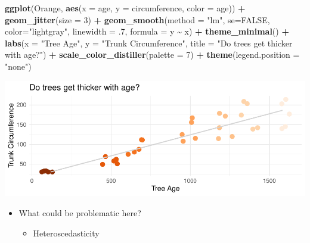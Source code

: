 \documentclass[
]{book}
\newenvironment{Shaded}{\begin{snugshade}}{\end{snugshade}}
\newcommand{\AttributeTok}[1]{\textcolor[rgb]{0.13,0.29,0.53}{#1}}
\newcommand{\ConstantTok}[1]{\textcolor[rgb]{0.56,0.35,0.01}{#1}}
\newcommand{\DecValTok}[1]{\textcolor[rgb]{0.00,0.00,0.81}{#1}}
\newcommand{\FunctionTok}[1]{\textcolor[rgb]{0.13,0.29,0.53}{\textbf{#1}}}
\newcommand{\NormalTok}[1]{#1}
\newcommand{\SpecialCharTok}[1]{\textcolor[rgb]{0.81,0.36,0.00}{\textbf{#1}}}
\newcommand{\StringTok}[1]{\textcolor[rgb]{0.31,0.60,0.02}{#1}}
\providecommand{\tightlist}{%
  \setlength{\itemsep}{0pt}\setlength{\parskip}{0pt}}
\begin{document}
\begin{Shaded}
\begin{Highlighting}[]
\FunctionTok{ggplot}\NormalTok{(Orange, }\FunctionTok{aes}\NormalTok{(}\AttributeTok{x =}\NormalTok{ age, }\AttributeTok{y =}\NormalTok{ circumference, }\AttributeTok{color =}\NormalTok{ age)) }\SpecialCharTok{+} \FunctionTok{geom\_jitter}\NormalTok{(}\AttributeTok{size =} \DecValTok{3}\NormalTok{) }\SpecialCharTok{+}
  \FunctionTok{geom\_smooth}\NormalTok{(}\AttributeTok{method =} \StringTok{"lm"}\NormalTok{, }\AttributeTok{se=}\ConstantTok{FALSE}\NormalTok{, }\AttributeTok{color=}\StringTok{"lightgray"}\NormalTok{, }
              \AttributeTok{linewidth =}\NormalTok{ .}\DecValTok{7}\NormalTok{, }\AttributeTok{formula =}\NormalTok{ y }\SpecialCharTok{\textasciitilde{}}\NormalTok{ x) }\SpecialCharTok{+} \FunctionTok{theme\_minimal}\NormalTok{() }\SpecialCharTok{+} \FunctionTok{labs}\NormalTok{(}\AttributeTok{x =} \StringTok{"Tree Age"}\NormalTok{, }\AttributeTok{y =} \StringTok{"Trunk Circumference"}\NormalTok{, }\AttributeTok{title =} \StringTok{"Do trees get thicker with age?"}\NormalTok{) }\SpecialCharTok{+} \FunctionTok{scale\_color\_distiller}\NormalTok{(}\AttributeTok{palette =} \DecValTok{7}\NormalTok{) }\SpecialCharTok{+} \FunctionTok{theme}\NormalTok{(}\AttributeTok{legend.position =} \StringTok{"none"}\NormalTok{)}
\end{Highlighting}
\end{Shaded}

\includegraphics{_main_files/figure-latex/unnamed-chunk-81-1.pdf}

\begin{itemize}
\tightlist
\item
  What could be problematic here?

  \begin{itemize}
  \tightlist
  \item
    Heteroscedasticity
  \end{itemize}
\end{itemize}
\end{document}

